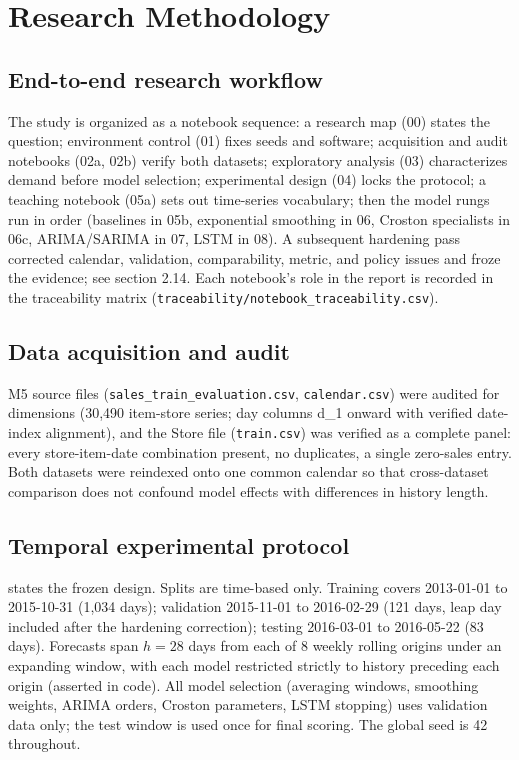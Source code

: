 \section{Research Methodology}
\label{sec:method}

\subsection{End-to-end research workflow}
\label{sec:workflow}
The study is organized as a notebook sequence: a research map (00) states the
question; environment control (01) fixes seeds and software; acquisition and
audit notebooks (02a, 02b) verify both datasets; exploratory analysis (03)
characterizes demand before model selection; experimental design (04) locks
the protocol; a teaching notebook (05a) sets out time-series vocabulary; then
the model rungs run in order (baselines in 05b, exponential smoothing in 06,
Croston specialists in 06c, ARIMA/SARIMA in 07, LSTM in 08). A subsequent
hardening pass corrected calendar, validation, comparability, metric, and
policy issues and froze the evidence; see section 2.14. Each
notebook's role in the report is recorded in the traceability matrix
(\texttt{traceability/notebook\_traceability.csv}).

\subsection{Data acquisition and audit}
\label{sec:acquisition}
M5 source files (\texttt{sales\_train\_evaluation.csv}, \texttt{calendar.csv})
were audited for dimensions (30,490 item-store series; day columns d\_1 onward
with verified date-index alignment), and the Store file (\texttt{train.csv})
was verified as a complete panel: every store-item-date combination present,
no duplicates, a single zero-sales entry. Both datasets were reindexed onto
one common calendar so that cross-dataset comparison does not confound model
effects with differences in history length.

\subsection{Temporal experimental protocol}
\label{sec:protocol}
 states the frozen design. Splits are time-based only.
Training covers 2013-01-01 to 2015-10-31 (1,034 days); validation 2015-11-01
to 2016-02-29 (121 days, leap day included after the hardening correction);
testing 2016-03-01 to 2016-05-22 (83 days). Forecasts span $h=28$ days from
each of 8 weekly rolling origins under an expanding window, with each model
restricted strictly to history preceding each origin (asserted in code). All
model selection (averaging windows, smoothing weights, ARIMA orders, Croston
parameters, LSTM stopping) uses validation data only; the test window is used
once for final scoring. The global seed is 42 throughout.

